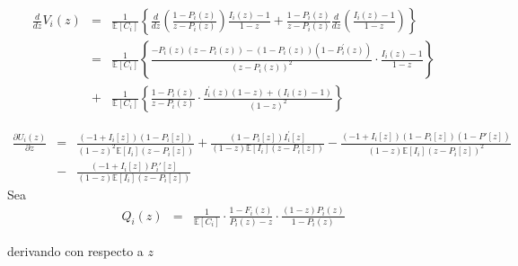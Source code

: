 \documentclass{article}
\newcommand{\esp}{\mathbb{E}}
\begin{document}
\begin{eqnarray*}
\frac{d}{dz}V_{i}\left(z\right)&=&\frac{1}{\esp\left[C_{i}\right]}\left\{\frac{d}{dz}\left(\frac{1-P_{i}\left(z\right)}{z-P_{i}\left(z\right)}\right)\frac{I_{i}\left(z\right)-1}{1-z}+\frac{1-P_{i}\left(z\right)}{z-P_{i}\left(z\right)}\frac{d}{dz}\left(\frac{I_{i}\left(z\right)-1}{1-z}\right)\right\}\\
&=&\frac{1}{\esp\left[C_{i}\right]}\left\{\frac{-P_{i}\left(z\right)\left(z-P_{i}\left(z\right)\right)-\left(1-P_{i}\left(z\right)\right)\left(1-P_{i}^{'}\left(z\right)\right)}{\left(z-P_{i}\left(z\right)\right)^{2}}\cdot\frac{I_{i}\left(z\right)-1}{1-z}\right\}\\
&+&\frac{1}{\esp\left[C_{i}\right]}\left\{\frac{1-P_{i}\left(z\right)}{z-P_{i}\left(z\right)}\cdot\frac{I_{i}^{'}\left(z\right)\left(1-z\right)+\left(I_{i}\left(z\right)-1\right)}{\left(1-z\right)^{2}}\right\}
\end{eqnarray*}


\begin{eqnarray*}
\frac{\partial U_{i}\left(z\right)}{\partial z}&=&\frac{(-1+I_{i}[z]) (1-P_{i}[z])}{(1-z)^2 \esp[I_{i}] (z-P_{i}[z])}+\frac{(1-P_{i}[z]) I_{i}^{'}[z]}{(1-z) \esp[I_{i}] (z-P_{i}[z])}-\frac{(-1+I_{i}[z]) (1-P_{i}[z])\left(1-P{'}[z]\right)}{(1-z) \esp[I_{i}] (z-P_{i}[z])^2}\\
&-&\frac{(-1+I_{i}[z]) P_{i}{'}[z]}{(1-z) \esp[I_{i}](z-P_{i}[z])}
\end{eqnarray*}
Sea 
\begin{eqnarray*}
Q_{i}\left(z\right)&=&\frac{1}{\esp\left[C_{i}\right]}\cdot\frac{1-F_{i}\left(z\right)}{P_{i}\left(z\right)-z}\cdot\frac{\left(1-z\right)P_{i}\left(z\right)}{1-P_{i}\left(z\right)}
\end{eqnarray*}

derivando con respecto a $z$
\end{document}
